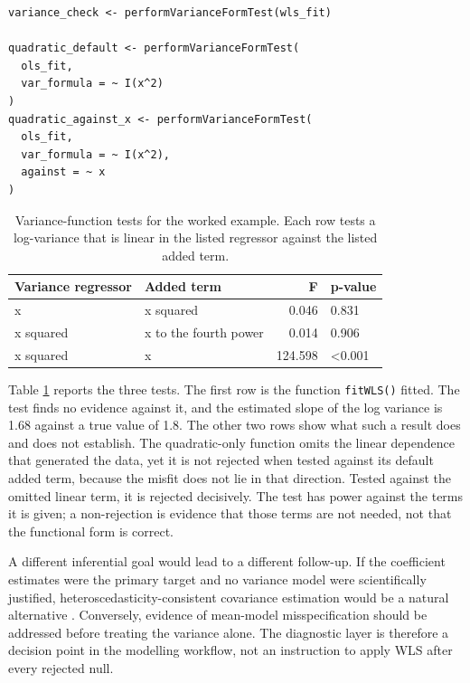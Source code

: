 \begin{verbatim}
variance_check <- performVarianceFormTest(wls_fit)

quadratic_default <- performVarianceFormTest(
  ols_fit,
  var_formula = ~ I(x^2)
)
quadratic_against_x <- performVarianceFormTest(
  ols_fit,
  var_formula = ~ I(x^2),
  against = ~ x
)
\end{verbatim}

\begin{table}

\caption{\label{tab:workflow-variance-form-table}Variance-function tests for the worked example. Each row tests a log-variance that is linear in the listed regressor against the listed added term.}
\centering
\begin{tabular}[t]{llrl}
\toprule
Variance regressor & Added term & F & p-value\\
\midrule
x & x squared & 0.046 & 0.831\\
x squared & x to the fourth power & 0.014 & 0.906\\
x squared & x & 124.598 & <0.001\\
\bottomrule
\end{tabular}
\end{table}

Table \ref{tab:workflow-variance-form-table} reports the three tests. The
first row is the function \texttt{fitWLS()} fitted. The test finds no evidence
against it, and the estimated slope of the log variance is
1.68
against a true value of 1.8. The other two rows show what such a result does
and does not establish. The quadratic-only function omits the linear
dependence that generated the data, yet it is not rejected when tested against
its default added term, because the misfit does not lie in that direction.
Tested against the omitted linear term, it is rejected decisively. The test has power against the terms it is given; a
non-rejection is evidence that those terms are not needed, not that the
functional form is correct.

A different inferential goal would lead to a different follow-up. If the
coefficient estimates were the primary target and no variance model were
scientifically justified, heteroscedasticity-consistent covariance estimation
would be a natural alternative \citep{zeileis2006sandwich}. Conversely, evidence of
mean-model misspecification should be addressed before treating the variance
alone. The diagnostic layer is therefore a decision point in the modelling
workflow, not an instruction to apply WLS after every rejected null.

